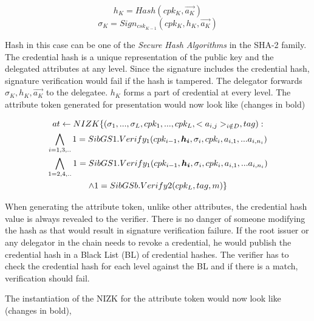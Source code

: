 \documentclass[journal]{IEEEtran}
\begin{document}
$$
h_K = Hash(cpk_K,\overrightarrow{a_K})
$$
$$
\sigma_K = Sign_{csk_{K-1}}(cpk_K,h_K,\overrightarrow{a_K})
$$

Hash in this case can be one of the \textit{Secure Hash Algorithms} in the SHA-2 family. The credential hash is a unique representation of the public key and the delegated attributes at any level. Since the signature includes the credential hash, signature verification would fail if the hash is tampered. The delegator forwards $\sigma_K, h_K, \overrightarrow{a_K}$ to the delegatee. $h_K$ forms a part of credential at every level. The attribute token generated for presentation would now look like (changes in bold)

\begin{multline}
$$
at \leftarrow NIZK \lbrace(\sigma_1,...,\sigma_L,cpk_1,...,cpk_L,<a_{i,j}>_{i \notin D},tag) : \\ 
\bigwedge \limits _{i=1,3,..} 1 = SibGS1.Verify_1(cpk_{i-1}, \boldsymbol{h_i}, \sigma_i,cpk_i,a_{i,1},...a_{i,n_i})\\
\bigwedge \limits _{1=2,4,..} 1 = SibGS1.Verify_1(cpk_{i-1}, \boldsymbol{h_i},\sigma_i,cpk_i,a_{i,1},...a_{i,n_i})\\
\wedge 1 = SibGSb.Verify2(cpk_L,tag,m)\rbrace
$$
\end{multline}

When generating the attribute token, unlike other attributes, the credential hash value is always revealed to the verifier. There is no danger of someone modifying the hash as that would result in signature verification failure. If the root issuer or any delegator in the chain needs to revoke a credential, he would publish the credential hash in a Black List (BL) of credential hashes. The verifier has to check the credential hash for each level against the BL and if there is a match,  verification should fail.

The instantiation of the NIZK for the attribute token would now look like (changes in bold),
\end{document}
